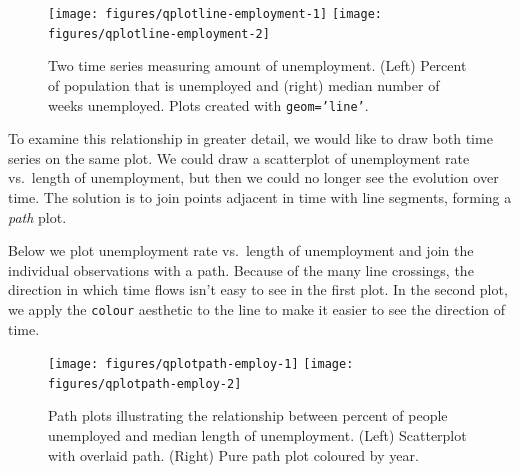 \begin{figure}

{\centering \texttt{[image: figures/qplotline-employment-1]} \texttt{[image: figures/qplotline-employment-2]} 

}

\caption{Two time series measuring amount of unemployment.  (Left) Percent of population that is unemployed and (right) median number of weeks unemployed.  Plots created with \texttt{geom='line'}.\label{fig:line-employment}}
\end{figure}

To examine this relationship in greater detail, we would like to draw
both time series on the same plot. We could draw a scatterplot of
unemployment rate vs.~length of unemployment, but then we could no
longer see the evolution over time. The solution is to join points
adjacent in time with line segments, forming a \emph{path} plot.

Below we plot unemployment rate vs.~length of unemployment and join the
individual observations with a path. Because of the many line crossings,
the direction in which time flows isn't easy to see in the first plot.
In the second plot, we apply the \texttt{colour} aesthetic to the line
to make it easier to see the direction of time.

\begin{Shaded}
\begin{Highlighting}[]
\StringTok{ }\StringTok{ }
\StringTok{ } 
    \NormalTok{(}\NormalTok{, }\NormalTok{))}
\StringTok{ } 
   \NormalTok{, } 
\end{Highlighting}
\end{Shaded}

\begin{figure}

{\centering \texttt{[image: figures/qplotpath-employ-1]} \texttt{[image: figures/qplotpath-employ-2]} 

}

\caption{Path plots illustrating the relationship between percent of people unemployed and median length of unemployment.  (Left) Scatterplot with overlaid path.  (Right) Pure path plot coloured by year.\label{fig:path-employ}}
\end{figure}

